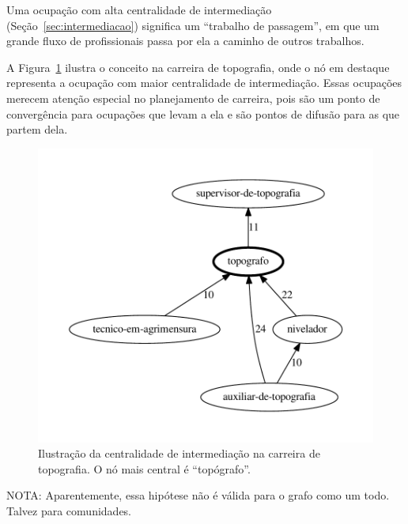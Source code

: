 \documentclass[12pt,a4paper]{article}
\begin{document}
\begin{hypothesis}
    Uma ocupação com alta centralidade de intermediação (Seção~\ref{sec:intermediacao}) significa um \enquote{trabalho de passagem}, em que um grande fluxo de profissionais passa por ela a caminho de outros trabalhos.
\end{hypothesis}

A Figura~\ref{fig:carreira-topografia} ilustra o conceito na carreira de topografia, onde o nó em destaque representa a ocupação com maior centralidade de intermediação. Essas ocupações merecem atenção especial no planejamento de carreira, pois são um ponto de convergência para ocupações que levam a ela e são pontos de difusão para as que partem dela.

\begin{figure}[ht]
  \centering
  \includegraphics[scale=0.6]{cluster_25.pdf}
  \caption{Ilustração da centralidade de intermediação na carreira de topografia. O nó mais central é \enquote{topógrafo}.}
  \label{fig:carreira-topografia}
\end{figure}

NOTA: Aparentemente, essa hipótese não é válida para o grafo como um todo. Talvez para comunidades.
\end{document}
